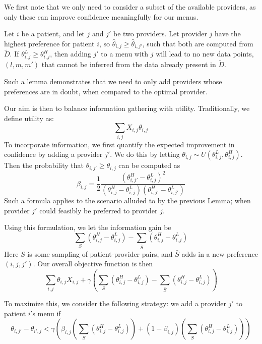 We first note that we only need to consider a subset of the available providers, as only these can improve confidence meaningfully for our menus. 
\begin{lemma}
    Let $i$ be a patient, and let $j$ and $j'$ be two providers. Let provider $j$ have the highest preference for patient $i$, so $\hat{\theta}_{i,j} \geq \hat{\theta}_{i,j'}$, such that both are computed from $\tilde{D}$. If $\theta_{i,j}^{L} \geq \theta_{i,j}^{H}$, then adding $j'$ to a menu with $j$ will lead to no new data points, $(l,m,m')$ that cannot be inferred from the data already present in $\tilde{D}$. 
\end{lemma}
Such a lemma demonstrates that we need to only add providers whose preferences are in doubt, when compared to the optimal provider. 

Our aim is then to balance information gathering with utility. 
Traditionally, we define utility as: 
\begin{equation}
    \sum_{i,j} X_{i,j} \theta_{i,j}
\end{equation}
To incorporate information, we first quantify the expected improvement in confidence by adding a provider $j'$. 
We do this by letting $\theta_{i,j} \sim U(\theta_{i,j}^{L},\theta_{i,j}^{H})$. 
Then the probability that $\theta_{i,j'} \geq \theta_{i,j}$ can be computed as 
\begin{equation}
    \beta_{i,j} = \frac{1}{2} \frac{(\theta_{i,j'}^{H}-\theta_{i,j}^{L})^{2}}{(\theta_{i,j}^{H}-\theta_{i,j}^{L})(\theta_{i,j'}^{H}-\theta_{i,j'}^{L})}
\end{equation}
Such a formula applies to the scenario alluded to by the previous Lemma; when provider $j'$ could feasibly be preferred to provider $j$. 

Using this formulation, we let the information gain be 
\begin{equation}
    \sum_{S} (\theta^{H}_{i,j}-\theta^{L}_{i,j}) - \sum_{\bar{S}} (\theta^{H}_{i,j}-\theta^{L}_{i,j}) 
\end{equation}
Here $S$ is some sampling of patient-provider pairs, and $\bar{S}$ adds in a new preference $(i,j,j')$. 
Our overall objective function is then
\begin{equation}
    \sum_{i,j} \theta_{i,j} X_{i,j} + \gamma (\sum_{S} (\theta^{H}_{i,j}-\theta^{L}_{i,j}) - \sum_{\bar{S}} (\theta^{H}_{i,j}-\theta^{L}_{i,j}) )
\end{equation}

To maximize this, we consider the following strategy: we add a provider $j'$ to patient $i$'s menu if 
\begin{equation}
    \theta_{i,j'} - \theta_{i',j} < \gamma (\beta_{i,j}(\sum_{S} (\theta^{H}_{i,j}-\theta^{L}_{i,j})) + (1-\beta_{i,j}) (\sum_{S} (\theta^{H}_{i,j}-\theta^{L}_{i,j})))
\end{equation}

